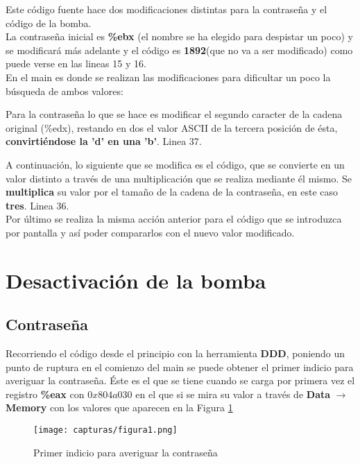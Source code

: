 	Este código fuente hace dos modificaciones distintas para la contraseña y el código de la bomba.
	\\
	
	La contraseña inicial es \textbf{\%ebx} (el nombre se ha elegido para despistar un poco) y se modificará más adelante y el código es \textbf{1892}(que no va a ser modificado) como puede verse en las lineas 15 y 16.
	\\
	
	En el main es donde se realizan las modificaciones para dificultar un poco la búsqueda de ambos valores:
	
	Para la contraseña lo que se hace es modificar el segundo caracter de la cadena original (\%edx), restando en dos el valor ASCII de la tercera posición de ésta, \textbf{convirtiéndose la 'd' en una 'b'}. Linea 37.
	
	A continuación, lo siguiente que se modifica es el código, que se convierte en un valor distinto a través de una multiplicación que se realiza mediante él mismo. Se \textbf{multiplica} su valor por el tamaño de la cadena de la contraseña, en este caso \textbf{tres}. Linea 36.
	\\
	
	Por último se realiza la misma acción anterior para el código que se introduzca por pantalla y así poder compararlos con el nuevo valor modificado.	
	
	
\newpage

\section{Desactivación de la bomba}

\subsection{Contraseña}
	Recorriendo el código desde el principio con la herramienta \textbf{DDD}, poniendo un punto de ruptura en el comienzo del main se puede obtener el primer indicio para averiguar la contraseña. Éste es el que se tiene cuando se carga por primera vez el registro \textbf{\%eax} con \textbf{$ 0x804a030 $} en el que si se mira su valor a través de \textbf{Data} $ \rightarrow $ \textbf{Memory} con los valores que aparecen en la Figura \ref{fig:figura1}
	
	\begin{figure}[H] %
		\centering
		\texttt{[image: capturas/figura1.png]} 
		\caption{Primer indicio para averiguar la contraseña} 
		\label{fig:figura1}
	\end{figure}

